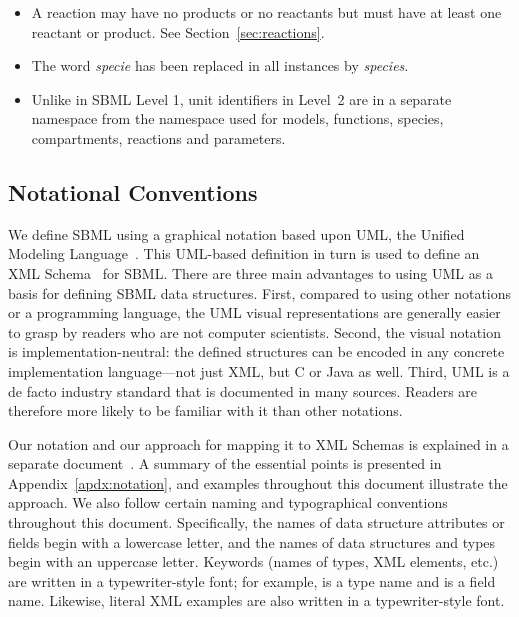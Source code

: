 \documentclass[10pt,twocolumntoc]{cekarticle}
\begin{document}
\begin{itemize}
\item A reaction may have no products or no reactants but must have at
  least one reactant or product.  See Section~\ref{sec:reactions}.
  
\item The word \emph{specie} has been replaced in all instances by
  \emph{species}.

\item Unlike in SBML Level 1, unit identifiers in Level~2 are in a separate
  namespace from the namespace used for models, functions, species,
  compartments, reactions and parameters.

\end{itemize}

\subsection{Notational Conventions}

We define SBML using a graphical notation based upon UML, the Unified
Modeling Language~\citep{eriksson:1998,oestereich:1999}.  This UML-based
definition in turn is used to define an XML
Schema~\citep{biron:2000,fallside:2000,thompson:2000} for SBML.  There are
three main advantages to using UML as a basis for defining SBML data
structures.  First, compared to using other notations or a programming
language, the UML visual representations are generally easier to grasp by
readers who are not computer scientists.  Second, the visual notation is
implementation-neutral: the defined structures can be encoded in any
concrete implementation language---not just XML, but C or Java as well.
Third, UML is a de facto industry standard that is documented in many
sources.  Readers are therefore more likely to be familiar with it than
other notations.

Our notation and our approach for mapping it to XML Schemas is explained in
a separate document~\citep{hucka:2000b}.  A summary of the essential points
is presented in Appendix~\ref{apdx:notation}, and examples throughout this
document illustrate the approach.  We also follow certain naming and
typographical conventions throughout this document.  Specifically, the
names of data structure attributes or fields begin with a lowercase letter,
and the names of data structures and types begin with an uppercase letter.
Keywords (names of types, XML elements, etc.) are written in a
typewriter-style font; for example,  is a type name and
 is a field name.  Likewise, literal XML examples are
also written in a typewriter-style font.
\end{document}
